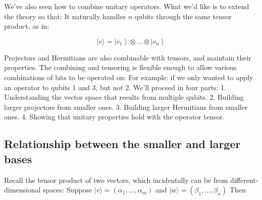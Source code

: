 \documentclass[main.tex]{subfiles}
\begin{document}
    We've also seen how to combine unitary operators. What we'd like is to extend the theory so that: It naturally handles $n$ qubits through the same tensor product, as in:
    
    $$
    |v\rangle=\left|v_{1}\right\rangle \otimes \ldots \otimes\left|v_{n}\right\rangle
    $$
    
    Projectors and Hermitians are also combinable with tensors, and maintain their properties. The combining and tensoring is flexible enough to allow various combinations of bits to be operated on: For example: if we only wanted to apply an operator to qubits 1 and 3, but not 2. We'll proceed in four parts: 1. Understanding the vector space that results from multiple qubits. 2. Building larger projectors from smaller ones. 3. Building larger Hermitians from smaller ones. 4. Showing that unitary properties hold with the operator tensor.

\subsection{Relationship between the smaller and larger bases}

    Recall the tensor product of two vectors, which incidentally can be from different-dimensional spaces: Suppose $|v\rangle=\left(\alpha_{1}, \ldots, \alpha_{m}\right)$ and $|w\rangle=\left(\beta_{1}, \ldots, \beta_{n}\right)$ Then
    
\end{document}
